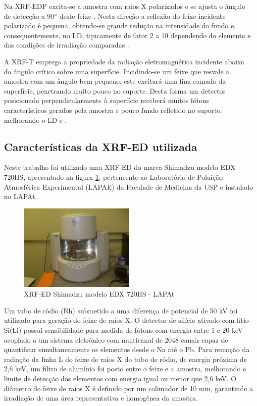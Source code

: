 Na XRF-EDP excita-se a amostra com raios X polarizados e se ajusta o ângulo 
de detecção a 90$\degree$ deste feixe \citep{dzubay1974}. Nesta direção a 
reflexão do feixe incidente polarizado é pequena, obtendo-se grande redução 
na intensidade do fundo e, consequentemente, no LD, tipicamente de fator 2 a 10
dependendo do elemento e das condições de irradiação comparadas 
\citep{meel2009}.

A XRF-T emprega a propriedade da radiação eletromagnética incidente abaixo do
ângulo crítico sobre uma superfície. Incidindo-se um feixe que resvale a amostra
com um ângulo bem pequeno, este excitará uma fina camada da superfície, 
penetrando muito pouco no suporte. Desta forma um detector posicionado 
perpendicularmente à superfície receberá muitos fótons característicos gerados 
pela amostra e pouco fundo refletido no suporte, melhorando o LD
\citep{yoneda1971} e \citep{aiginger1974}.

\subsection{Características da XRF-ED utilizada}

Neste trabalho foi utilizado uma XRF-ED da marca Shimadzu modelo EDX 720HS, 
apresentado na figura \ref{fig:xrfed_iag},
pertencente ao Laboratório de Poluição Atmosférica Experimental (LAPAE) 
da Faculade de Medicina da USP e instalado no LAPAt. 

\begin{figure}[H]
  \centering
  \includegraphics[width=0.5\textwidth]{../inputs/images/xrf-ed-IAG-USP.jpg}
  \caption{XRF-ED Shimadzu modelo EDX 720HS - LAPAt \label{fig:xrfed_iag}}
\end{figure}

Um tubo de ródio (Rh) submetido a uma diferença de potencial 
de 50 kV foi utilizado para geração do feixe de raios X.
O detector de silício ativado com lítio Si(Li) possui sensibilidade
para medida de fótons com energia entre 1 e 20 keV acoplado a um sistema 
eletrônico com multicanal de 2048 canais capaz de quantificar simultaneamente 
os elementos desde o Na até o Pb. Para remoção da radiação da linha L do feixe 
de raios X do tubo de ródio, de energia próxima de 2,6 keV, um filtro de 
alumínio foi posto entre o feixe e a amostra, melhorando o limite de detecção 
dos elementos com energia igual ou menor que 2,6 keV. O diâmetro do feixe de 
raios X é definido por um colimador de 10 mm, garantindo a irradiação de uma 
área representativa e homogênea da amostra. 


